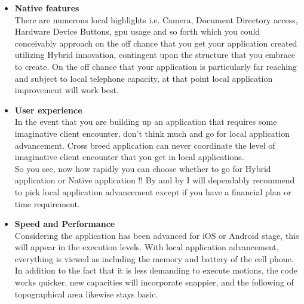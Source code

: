 \begin{itemize}
  \item \textbf{Native features} \\ 
  There are numerous local highlights i.e. Camera, Document Directory access, Hardware Device Buttons, \gls{gpu} usage and so forth which you could conceivably approach on the off chance that you get your application created utilizing Hybrid innovation, contingent upon the structure that you embrace to create. On the off chance that your application is particularly far reaching and subject to local telephone capacity, at that point local application improvement will work best.
  
  \item \textbf{User experience} \\ 
  In the event that you are building up an application that requires some imaginative client encounter, don't think much and go for local application advancement. Cross breed application can never coordinate the level of imaginative client encounter that you get in local applications. \\
  So you see, now how rapidly you can choose whether to go for Hybrid application or Native application !! By and by I will dependably recommend to pick local application advancement except if you have a financial plan or time requirement.
  
  \item \textbf{Speed and Performance} \\
 Considering the application has been advanced for iOS or Android stage, this will appear in the execution levels. With local application advancement, everything is viewed as including the memory and battery of the cell phone. In addition to the fact that it is less demanding to execute motions, the code works quicker, new capacities will incorporate snappier, and the following of topographical area likewise stays basic.
 
\end{itemize}
